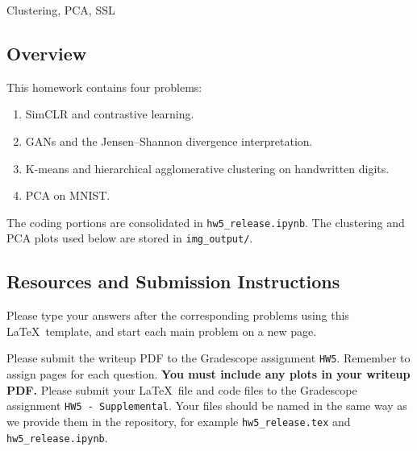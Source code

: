 \documentclass[submit]{harvardml}
\begin{document}
\begin{center}
{\Large Clustering, PCA, SSL}\\
\end{center}

\subsection*{Overview}
This homework contains four problems:
\begin{enumerate}[leftmargin=*]
    \item SimCLR and contrastive learning.
    \item GANs and the Jensen--Shannon divergence interpretation.
    \item K-means and hierarchical agglomerative clustering on handwritten digits.
    \item PCA on MNIST.
\end{enumerate}
The coding portions are consolidated in \texttt{hw5\_release.ipynb}. The clustering and PCA plots used below are stored in \texttt{img\_output/}.

\subsection*{Resources and Submission Instructions}
Please type your answers after the corresponding problems using this \LaTeX\ template, and start each main problem on a new page.

Please submit the writeup PDF to the Gradescope assignment \texttt{HW5}. Remember to assign pages for each question. \textbf{You must include any plots in your writeup PDF.} Please submit your \LaTeX\ file and code files to the Gradescope assignment \texttt{HW5 - Supplemental}. Your files should be named in the same way as we provide them in the repository, for example \texttt{hw5\_release.tex} and \texttt{hw5\_release.ipynb}.
\end{document}
